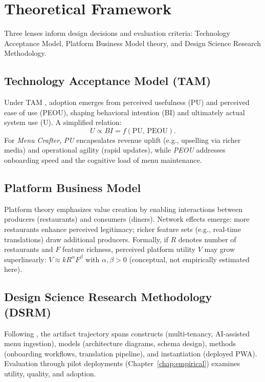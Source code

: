 \section{Theoretical Framework}\label{sec:theory}
Three lenses inform design decisions and evaluation criteria: Technology Acceptance Model, Platform Business Model theory, and Design Science Research Methodology.

\subsection{Technology Acceptance Model (TAM)}
Under TAM \cite{davis1989}, adoption emerges from perceived usefulness (PU) and perceived ease of use (PEOU), shaping behavioral intention (BI) and ultimately actual system use (U). A simplified relation:
\begin{equation}\label{eq:tam}
U \propto BI = f(\mathrm{PU},\, \mathrm{PEOU}).
\end{equation}
\noindent For \emph{Menu Crafter}, \emph{PU} encapsulates revenue uplift (e.g., upselling via richer media) and operational agility (rapid updates), while \emph{PEOU} addresses onboarding speed and the cognitive load of menu maintenance.

\subsection{Platform Business Model}
Platform theory \cite{parker2016} emphasizes value creation by enabling interactions between producers (restaurants) and consumers (diners). Network effects emerge: more restaurants enhance perceived legitimacy; richer feature sets (e.g., real-time translations) draw additional producers. Formally, if $R$ denotes number of restaurants and $F$ feature richness, perceived platform utility $V$ may grow superlinearly: $V \approx k R^{\alpha} F^{\beta}$ with $\alpha,\beta > 0$ (conceptual, not empirically estimated here).

\subsection{Design Science Research Methodology (DSRM)}
Following \cite{hevner2004}, the artifact trajectory spans constructs (multi-tenancy, AI-assisted menu ingestion), models (architecture diagrams, schema design), methods (onboarding workflows, translation pipeline), and instantiation (deployed PWA). Evaluation through pilot deployments (Chapter~\ref{chap:empirical}) examines utility, quality, and adoption.


